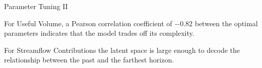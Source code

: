 \documentclass[10pt, xcolor=table]{beamer}
\newlength\figureheight
\newlength\figurewidth
\begin{document}
\begin{frame}{Parameter Tuning II}

    \begin{multicols}{2}

    \begin{figure}[htpb]
     \centering
     \setlength\figurewidth{\columnwidth}
     \setlength{}
     
    \end{figure}

    For Useful Volume, a Pearson correlation coefficient of $-0.82$ between the optimal parameters indicates that the model trades off its complexity.
    
    \columnbreak

    \begin{figure}[htpb]
     \centering
     \setlength\figurewidth{\columnwidth}
     \setlength{}
     
    \end{figure}

    For Streamflow Contributions the latent space is large enough to decode the relationship between the past and the farthest horizon. 
            
    \end{multicols}



    
\end{frame}
\end{document}
